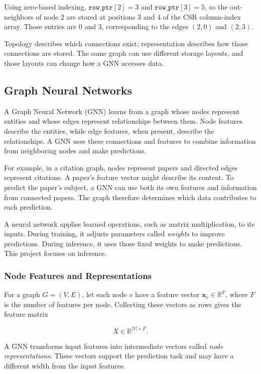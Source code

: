 Using zero-based indexing, $\texttt{row\_ptr}[2]=3$ and
$\texttt{row\_ptr}[3]=5$, so the out-neighbors of node $2$ are stored at
positions $3$ and $4$ of the CSR column-index array. Those entries are $0$ and
$3$, corresponding to the edges $(2,0)$ and $(2,3)$.

Topology describes which connections exist; representation describes how
those connections are stored. The same graph can use different storage layouts,
and those layouts can change how a GNN accesses data.


\subsection{Graph Neural Networks}
\label{sec:gnns}

A Graph Neural Network (GNN) learns from a graph whose nodes represent entities and whose edges represent relationships between them. Node features describe the entities, while edge features, when present, describe the relationships. A GNN uses these connections and features to combine information from neighboring nodes and make predictions.

For example, in a citation graph, nodes represent papers and directed edges represent citations. A paper's feature vector might describe its content. To predict the paper's subject, a GNN can use both its own features and information from connected papers. The graph therefore determines which data contributes to each prediction.

A neural network applies learned operations, such as matrix multiplication, to its inputs. During training, it adjusts parameters called \emph{weights} to improve predictions. During inference, it uses those fixed weights to make predictions. This project focuses on inference.

\subsubsection{Node Features and Representations}

For a graph $G=(V,E)$, let each node $v$ have a feature vector $\mathbf{x}_v\in\mathbb{R}^{F}$, where $F$ is the number of features per node. Collecting these vectors as rows gives the feature matrix

\[
  X\in\mathbb{R}^{|V|\times F}.
\]

A GNN transforms input features into intermediate vectors called \emph{node representations}. These vectors support the prediction task and may have a different width from the input features.

